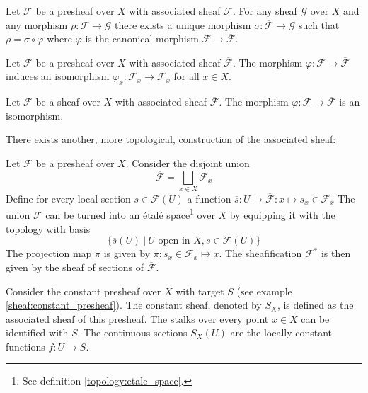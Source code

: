 	\begin{uproperty}
		Let $\mathcal{F}$ be a presheaf over $X$ with associated sheaf $\overline{\mathcal{F}}$. For any sheaf $\mathcal{G}$ over $X$ and any morphism $\rho:\mathcal{F}\rightarrow\mathcal{G}$ there exists a unique morphism $\sigma:\overline{\mathcal{F}}\rightarrow\mathcal{G}$ such that $\rho = \sigma\circ\varphi$ where $\varphi$ is the canonical morphism $\mathcal{F}\rightarrow\overline{\mathcal{F}}$.
	\end{uproperty}
	
	\begin{property}
		Let $\mathcal{F}$ be a presheaf over $X$ with associated sheaf $\overline{\mathcal{F}}$. The morphism $\varphi:\mathcal{F}\rightarrow\overline{\mathcal{F}}$ induces an isomorphism $\varphi_x:\mathcal{F}_x\rightarrow\overline{\mathcal{F}}_x$ for all $x\in X$.
	\end{property}
	\begin{property}
		Let $\mathcal{F}$ be a sheaf over $X$ with associated sheaf $\overline{\mathcal{F}}$. The morphism $\varphi:\mathcal{F}\rightarrow\overline{\mathcal{F}}$ is an isomorphism.
	\end{property}
	
	There exists another, more topological, construction of the associated sheaf:
	\begin{construct}\label{sheaf:etale_construction}
		Let $\mathcal{F}$ be a presheaf over $X$. Consider the disjoint union
		\begin{equation}
			\overline{\mathcal{F}} = \bigsqcup_{x\in X}\mathcal{F}_x
		\end{equation}
		Define for every local section $s\in\mathcal{F}(U)$ a function $\overline{s}:U\rightarrow\overline{\mathcal{F}}:x\mapsto s_x\in\mathcal{F}_x$ The union $\overline{\mathcal{F}}$ can be turned into an \'etal\'e space\footnote{See definition \ref{topology:etale_space}.} over $X$ by equipping it with the topology with basis
		\begin{equation}
			\{\overline{s}(U)\ |\ U\text{ open in }X, s\in\mathcal{F}(U)\}
		\end{equation}
		The projection map $\pi$ is given by $\pi:s_x\in\mathcal{F}_x\mapsto x$. The sheafification $\mathcal{F}^\ast$ is then given by the sheaf of sections of $\overline{\mathcal{F}}$.
	\end{construct}
	
	\begin{example}
		Consider the constant presheaf over $X$ with target $S$ (see example \ref{sheaf:constant_presheaf}). The constant sheaf, denoted by $S_X$, is defined as the associated sheaf of this presheaf. The stalks over every point $x\in X$ can be identified with $S$. The continuous sections $S_X(U)$ are the locally constant functions $f:U\rightarrow S$.
	\end{example}
		
